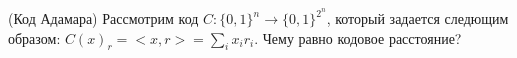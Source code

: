(Код Адамара) Рассмотрим код $C: \{0, 1\}^n \to \{0, 1\}^{2^n}$, который задается следющим образом: $C(x)_r = {<}x, r{>} =
\sum\limits_i x_i r_i$. Чему равно кодовое расстояние?